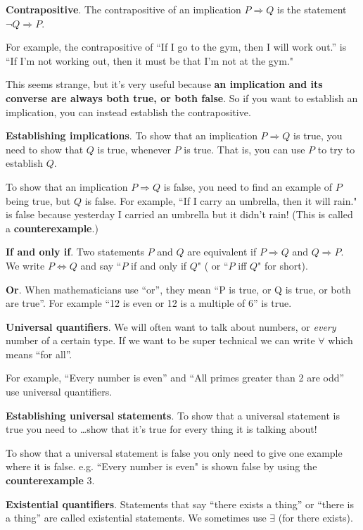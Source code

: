 \documentclass[11pt]{article}
\theoremstyle{definition}
\numberwithin{thm}{section}
\begin{document}
\textbf{Contrapositive}. The contrapositive of an implication $P \Rightarrow Q$ is the statement $\neg Q \Rightarrow P$. 

For example, the contrapositive of ``If I go to the gym, then I will work out.'' is ``If I'm not working out, then it must be that I'm not at the gym."

This seems strange, but it's very useful because \textbf{an implication and its converse are always both true, or both false}. So if you want to establish an implication, you can instead establish the contrapositive.

\textbf{Establishing implications}. To show that an implication $P \Rightarrow Q$ is true, you need to show that $Q$ is true, whenever $P$ is true. That is, you can use $P$ to try to establish $Q$.

To show that an implication $P \Rightarrow Q$ is false, you need to find an example of $P$ being true, but $Q$ is false. For example, ``If I carry an umbrella, then it will rain." is false because yesterday I carried an umbrella but it didn't rain! (This is called a \textbf{counterexample}.)

\textbf{If and only if}. Two statements $P$ and $Q$ are equivalent if $P \Rightarrow Q$ and $Q \Rightarrow P$. We write $P \Leftrightarrow Q$ and say ``$P$ if and only if $Q$" ( or ``$P$ iff $Q$" for short).

\textbf{Or}. When mathematicians use ``or'', they mean ``P is true, or Q is true, or both are true''. For example ``12 is even or 12 is a multiple of 6'' is true.

\textbf{Universal quantifiers}. We will often want to talk about  numbers, or \textit{every} number of a certain type. If we want to be super technical we can write $\forall$ which means ``for all''.

For example, ``Every number is even'' and ``All primes greater than 2 are odd'' use universal quantifiers.

\textbf{Establishing universal statements}. To show that a universal statement is true you need to \ldots show that it's true for every thing it is talking about!

To show that a universal statement is false you only need to give one example where it is false. e.g. ``Every number is even" is shown false by using the \textbf{counterexample} $3$.

\textbf{Existential quantifiers}. Statements that say ``there exists a thing'' or ``there is a thing'' are called existential statements. We sometimes use $\exists$ (for there exists).
\end{document}
